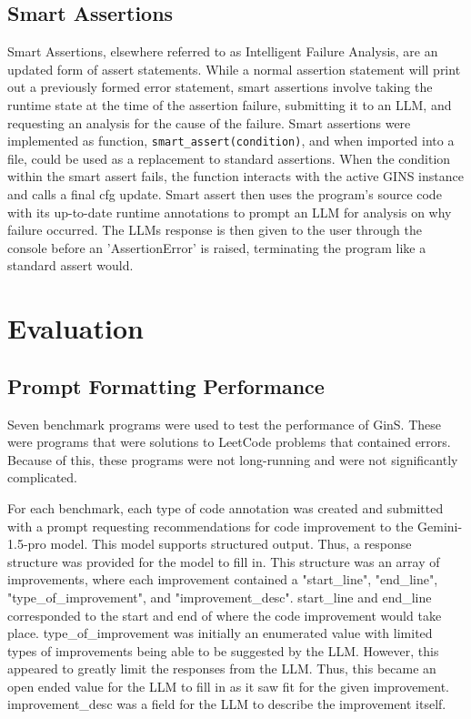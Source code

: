 \documentclass[sigconf]{acmart}
\begin{document}
\subsection{Smart Assertions}
Smart Assertions, elsewhere referred to as Intelligent Failure Analysis, are an updated form of assert statements.
While a normal assertion statement will print out a previously formed error statement, smart assertions involve taking the runtime state at the time of the assertion failure, submitting it to an LLM, and requesting an analysis for the cause of the failure.
Smart assertions were implemented as function, \texttt{smart\_assert(condition)}, and when imported into a file, could be used as a replacement to standard assertions. When the condition within the smart assert fails, the function interacts with the active GINS instance and calls a final cfg update.
Smart assert then uses the program's source code with its up-to-date runtime annotations to prompt an LLM for analysis on why failure occurred.
The LLMs response is then given to the user through the console before an 'AssertionError' is raised, terminating the program like a standard assert would.

\section{Evaluation}
\subsection{Prompt Formatting Performance}

Seven benchmark programs were used to test the performance of GinS.
These were programs that were solutions to LeetCode problems that contained errors.
Because of this, these programs were not long-running and were not significantly complicated.

For each benchmark, each type of code annotation was created and submitted with a prompt requesting recommendations for code improvement to the Gemini-1.5-pro model.
This model supports structured output.
Thus, a response structure was provided for the model to fill in.
This structure was an array of improvements, where each improvement contained a "start\_line", "end\_line", "type\_of\_improvement", and "improvement\_desc".
start\_line and end\_line corresponded to the start and end of where the code improvement would take place.
type\_of\_improvement was initially an enumerated value with limited types of improvements being able to be suggested by the LLM.
However, this appeared to greatly limit the responses from the LLM.
Thus, this became an open ended value for the LLM to fill in as it saw fit for the given improvement.
improvement\_desc was a field for the LLM to describe the improvement itself.
\end{document}
